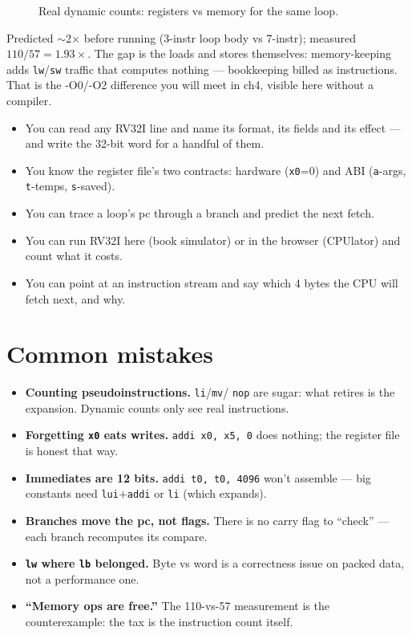 \begin{figure}[htbp]
\centering

\caption{Real dynamic counts: registers vs memory for the same loop.}
\label{fig:insn03}
\end{figure}

Predicted $\sim$2$\times$ before running (3-instr loop body vs
7-instr); measured $110/57 = 1.93\times$. The gap is the loads and
stores themselves: memory-keeping adds \texttt{lw}/\texttt{sw} traffic
that computes nothing --- bookkeeping billed as instructions. That is
the -O0/-O2 difference you will meet in ch4, visible here without a
compiler.

\begin{wins}
\begin{itemize}
\item You can read any RV32I line and name its format, its fields and
its effect --- and write the 32-bit word for a handful of them.
\item You know the register file's two contracts: hardware
(\texttt{x0}=0) and ABI (\texttt{a}-args, \texttt{t}-temps,
\texttt{s}-saved).
\item You can trace a loop's pc through a branch and predict the next
fetch.
\item You can run RV32I here (book simulator) or in the browser
(CPUlator) and count what it costs.
\item You can point at an instruction stream and say which 4 bytes the
CPU will fetch next, and why.
\end{itemize}
\end{wins}

\section{Common mistakes}
\label{sec:mistakes03}

\begin{itemize}
  \item \textbf{Counting pseudoinstructions.} \texttt{li}/\texttt{mv}/
        \texttt{nop} are sugar: what retires is the expansion. Dynamic
        counts only see real instructions.
  \item \textbf{Forgetting \texttt{x0} eats writes.}
        \texttt{addi x0, x5, 0} does nothing; the register file is
        honest that way.
  \item \textbf{Immediates are 12 bits.} \texttt{addi t0, t0, 4096}
        won't assemble --- big constants need \texttt{lui}$+$\texttt{addi}
        or \texttt{li} (which expands).
  \item \textbf{Branches move the pc, not flags.} There is no carry
        flag to ``check'' --- each branch recomputes its compare.
  \item \textbf{\texttt{lw} where \texttt{lb} belonged.} Byte vs word
        is a correctness issue on packed data, not a performance one.
  \item \textbf{``Memory ops are free.''} The 110-vs-57 measurement is
        the counterexample: the tax is the instruction count itself.
\end{itemize}

